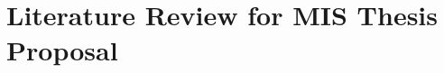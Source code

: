 \documentclass{article}
\begin{document}
%
%
%
%

\section{Literature Review for MIS Thesis Proposal}
\end{document}
